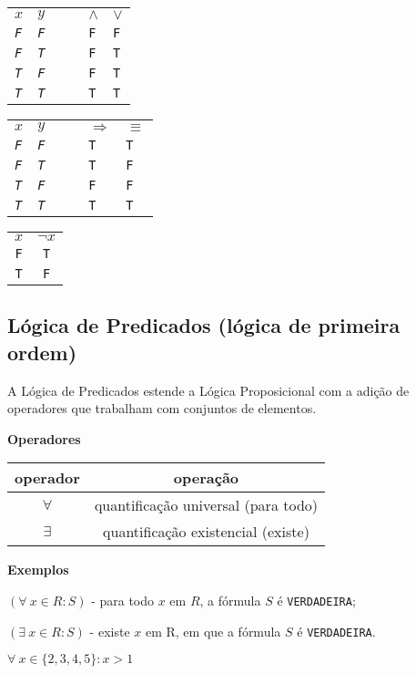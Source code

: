 \begin{longtable}[]{@{}llllll@{}}
\(x\) & \(y\) & & & \(\land\) & \(\lor\)\tabularnewline
\emph{\texttt{F}} & \emph{\texttt{F}} & & & \texttt{F} &
\texttt{F}\tabularnewline
\emph{\texttt{F}} & \emph{\texttt{T}} & & & \texttt{F} &
\texttt{T}\tabularnewline
\emph{\texttt{T}} & \emph{\texttt{F}} & & & \texttt{F} &
\texttt{T}\tabularnewline
\emph{\texttt{T}} & \emph{\texttt{T}} & & & \texttt{T} &
\texttt{T}\tabularnewline
\end{longtable}

    \begin{longtable}[]{@{}llllll@{}}
\(x\) & \(y\) & & & \(\Rightarrow\) & \(\equiv\)\tabularnewline
\emph{\texttt{F}} & \emph{\texttt{F}} & & & \texttt{T} &
\texttt{T}\tabularnewline
\emph{\texttt{F}} & \emph{\texttt{T}} & & & \texttt{T} &
\texttt{F}\tabularnewline
\emph{\texttt{T}} & \emph{\texttt{F}} & & & \texttt{F} &
\texttt{F}\tabularnewline
\emph{\texttt{T}} & \emph{\texttt{T}} & & & \texttt{T} &
\texttt{T}\tabularnewline
\end{longtable}

    \begin{longtable}[]{@{}cc@{}}
\(x\) & \(\lnot x\)\tabularnewline
\texttt{F} & \texttt{T}\tabularnewline
\texttt{T} & \texttt{F}\tabularnewline
\end{longtable}

\subsection*{Lógica de Predicados (lógica de primeira
ordem)}

A Lógica de Predicados estende a Lógica Proposicional com a adição de
operadores que trabalham com conjuntos de elementos.

\textbf{Operadores}

\begin{longtable}[]{@{}cc@{}}
operador & operação\tabularnewline
\endhead
\(\forall\) & quantificação universal (para todo)\tabularnewline
\(\exists\) & quantificação existencial (existe)\tabularnewline
\end{longtable}

    \textbf{Exemplos}

\((\forall\ x \in R : S)\) - para todo \(x\) em \(R\), a fórmula \(S\) é
\texttt{VERDADEIRA};

\((\exists \ x \in R : S)\) - existe \(x\) em R, em que a fórmula \(S\)
é \texttt{VERDADEIRA}.

\(\forall\ x \in \{2, 3, 4, 5\} : x > 1\)

